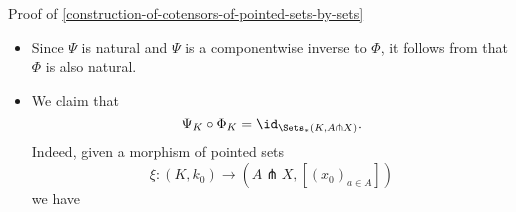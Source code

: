 \begin{Proof}{Proof of \cref{construction-of-cotensors-of-pointed-sets-by-sets}}
\begin{itemize}
\begin{webcompile}
\begin{tikzcd}[row sep=0.0*\the\DL, column sep=1.0*\the\DL, background color=backgroundColor, ampersand replacement=\&]
                \end{tikzcd}
            \end{webcompile}
            we have
            \begin{align*}
                [\Psi_{K}\circ(\phi^{*})_{*}](\xi) &= \Psi_{K}((\phi^{*})_{*}(\xi))\\
                                                   &= \Psi_{K}((\phi^{*})_{*}(\llbracket a\mapsto\xi_{a}\rrbracket))\\
                                                   &= \Psi_{K}((\llbracket a\mapsto\phi^{*}(\xi_{a})\rrbracket))\\
                                                   &= \Psi_{K}((\llbracket a\mapsto\llbracket k\mapsto\xi_{a}(\phi(k))\rrbracket\rrbracket))\\
                                                   &= \llbracket k\mapsto[(\xi_{a}(\phi(k)))_{a\in A}]\rrbracket\\
                                                   &= \phi^{*}(\llbracket k'\mapsto[(\xi_{a}(k'))_{a\in A}]\rrbracket)\\
                                                   &= \phi^{*}(\Psi_{K'}(\xi))\\
                                                   &= [\phi^{*}\circ\Psi_{K'}](\xi).
            \end{align*}
        \item{}Since $\Psi$ is natural and $\Psi$ is a componentwise inverse to $\Phi$, it follows from  that $\Phi$ is also natural.
        \item{}We claim that
            \[
                \Psi_{K}\circ\Phi_{K}%
                =%
                \id_{\Sets_{*}(K,A\pitchfork X)}.%
            \]%
            Indeed, given a morphism of pointed sets
            \[
                \xi%
                \colon%
                (K,k_{0})%
                \to%
                (A\pitchfork X,[(x_{0})_{a\in A}])%
            \]%
            we have
            \begin{align*}

\end{align*}
\end{itemize}
\end{Proof}
